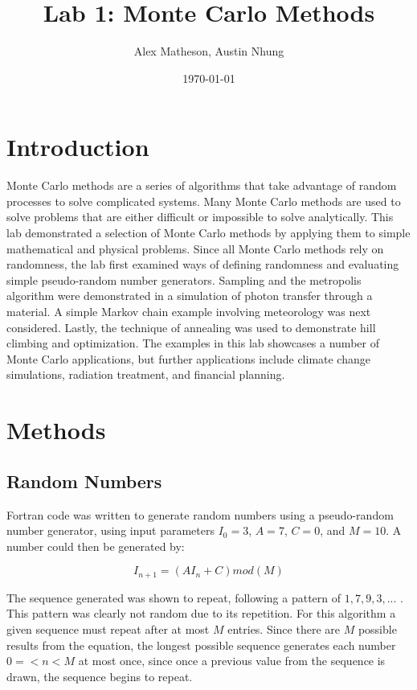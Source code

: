 \documentclass[twocolumn]{article}
\begin{document}
\title{Lab 1: Monte Carlo Methods}
\author{Alex Matheson, Austin Nhung}
\date{\today}
\maketitle

\section{Introduction}
Monte Carlo methods are a series of algorithms that take advantage of random processes to solve complicated systems. Many Monte Carlo methods are used to solve problems that are either difficult or impossible to solve analytically. This lab demonstrated a selection of Monte Carlo methods by applying them to simple mathematical and physical problems. Since all Monte Carlo methods rely on randomness, the lab first examined ways of defining randomness and evaluating simple pseudo-random number generators. Sampling and the metropolis algorithm were demonstrated in a simulation of photon transfer through a material. A simple Markov chain example involving meteorology was next considered. Lastly, the technique of annealing was used to demonstrate hill climbing and optimization. The examples in this lab showcases a number of Monte Carlo applications, but further applications include climate change simulations, radiation treatment, and financial planning.

\section{Methods}
\subsection{Random Numbers}
Fortran code was written to generate random numbers using a pseudo-random number generator, using input parameters $I_0=3$, $A=7$, $C=0$, and $M=10$. A number could then be generated by:

\begin{equation}
I_{n+1} = (AI_n + C) mod (M)
\end{equation} 

The sequence generated was shown to repeat, following a pattern of $1,7,9,3,...$ . This pattern was clearly not random due to its repetition. For this algorithm a given sequence must repeat after at most $M$ entries. Since there are $M$ possible results from the equation, the longest possible sequence generates each number $0=<n<M$ at most once, since once a previous value from the sequence is drawn, the sequence begins to repeat. 
\end{document}
